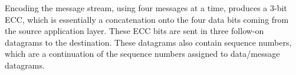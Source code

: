 \documentclass[conference]{IEEEtran}
\theoremstyle{definition}
\begin{document}
Encoding the message stream, using four messages
at a time, produces a 3-bit ECC, which is essentially
a concatenation onto the four data bits coming from the
source application layer.  These ECC bits are sent in
three follow-on datagrams to the destination. These
datagrams also contain sequence numbers, which are a
continuation of the sequence numbers assigned to
data/message datagrams.



\end{document}
